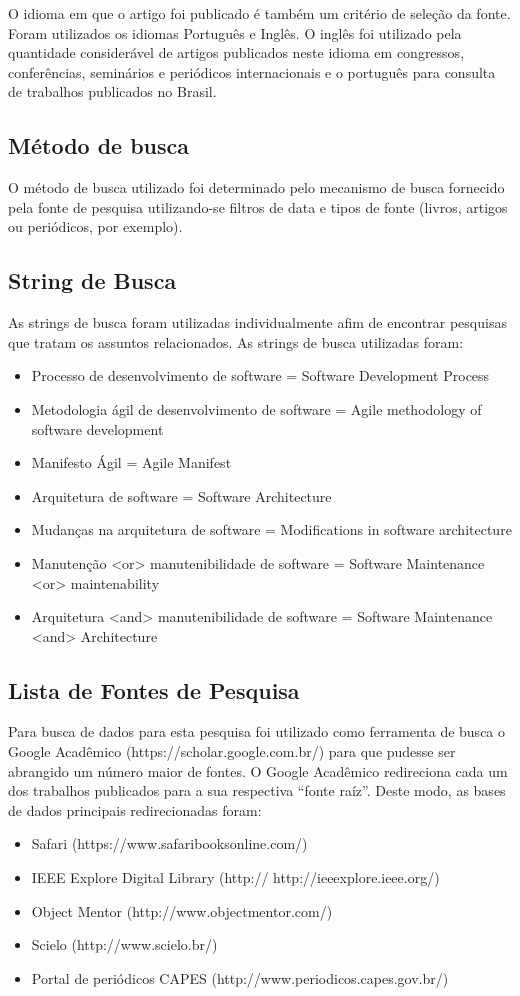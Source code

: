 O idioma em que o artigo foi publicado é também um critério de seleção da fonte. Foram utilizados os idiomas Português e Inglês. O inglês foi utilizado pela quantidade considerável de artigos publicados neste idioma em congressos, conferências, seminários e periódicos internacionais e o português para consulta de trabalhos publicados no Brasil.
\subsection{Método de busca}
O método de busca utilizado foi determinado pelo mecanismo de busca fornecido pela fonte de pesquisa utilizando-se filtros de data e tipos de fonte (livros, artigos ou periódicos, por exemplo).
\subsection{String de Busca}
As strings de busca foram utilizadas individualmente afim de encontrar pesquisas que tratam os assuntos relacionados. As strings de busca utilizadas foram:
\begin{itemize}
	\item Processo de desenvolvimento de software = Software Development Process
	\item Metodologia ágil de desenvolvimento de software = Agile methodology of software development
	\item Manifesto Ágil = Agile Manifest
	\item Arquitetura de software = Software Architecture
	\item Mudanças na arquitetura de software = Modifications in software architecture
	\item Manutenção <or> manutenibilidade de software = Software Maintenance <or> maintenability
	\item Arquitetura <and> manutenibilidade de software = Software Maintenance <and> Architecture

\end{itemize}

\subsection{Lista de Fontes de Pesquisa}
Para busca de dados para esta pesquisa foi utilizado como ferramenta de busca o Google Acadêmico (https://scholar.google.com.br/) para que pudesse ser abrangido um número maior de fontes. O Google Acadêmico redireciona cada um dos trabalhos publicados para a sua respectiva “fonte raíz”. Deste modo, as bases de dados principais redirecionadas foram:
\begin{itemize}
	\item Safari (https://www.safaribooksonline.com/)
	\item IEEE Explore Digital Library (http:// http://ieeexplore.ieee.org/)
	\item Object Mentor (http://www.objectmentor.com/)
	\item Scielo (http://www.scielo.br/)
	\item Portal de periódicos CAPES (http://www.periodicos.capes.gov.br/)

\end{itemize}

